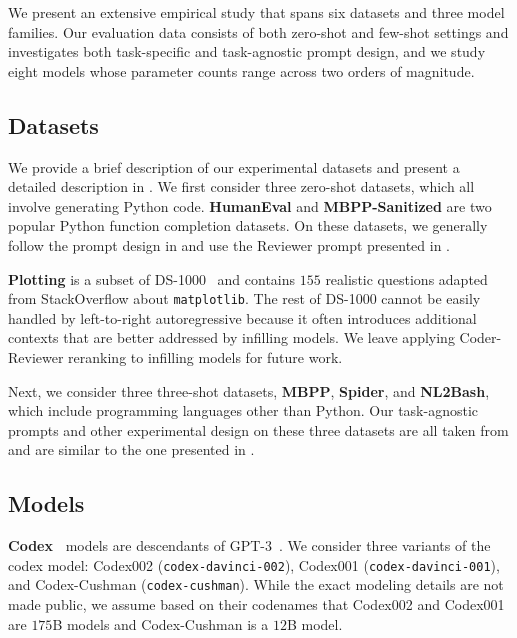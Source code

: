\documentclass[nohyperref]{article}
\theoremstyle{plain}
\theoremstyle{definition}
\theoremstyle{remark}
\renewcommand{\paragraph}[1]{
     \textbf{#1} 
 }
\begin{document}
\label{sec:exp-setup}
We present an extensive empirical study that spans six datasets and three model families.
Our evaluation data consists of both zero-shot and few-shot settings and investigates both task-specific and task-agnostic prompt design, and we study eight models whose parameter counts range across two orders of magnitude.


\subsection{Datasets}
We provide a brief description of our experimental datasets and present a detailed description in .
We first consider three zero-shot datasets, which all involve generating Python code.
\textbf{HumanEval} and \textbf{MBPP-Sanitized} are two popular Python function completion datasets.
On these datasets, we generally follow the prompt design in \citet{codet} and use the Reviewer prompt presented in .
\paragraph{Plotting} is a subset of DS-1000~\citep{Lai2022DS1000} and contains $155$ realistic questions adapted from StackOverflow about \texttt{matplotlib}. 
The rest of DS-1000 cannot be easily handled by left-to-right autoregressive because it often introduces additional contexts that are better addressed by infilling models.
We leave applying Coder-Reviewer reranking to infilling models for future work.



Next, we consider three three-shot datasets, \textbf{MBPP}, \textbf{Spider}, and \textbf{NL2Bash}, which include programming languages other than Python.
Our task-agnostic prompts and other experimental design on these three datasets are all taken from \citet{mbr} and are similar to the one presented in .


\subsection{Models}
\paragraph{Codex~\citep{codex}} models are descendants of GPT-3~\citep{gpt3}.
We consider three variants of the codex model: Codex002 (\texttt{codex-davinci-002}), Codex001 (\texttt{codex-davinci-001}), and Codex-Cushman (\texttt{codex-cushman}).
While the exact modeling details are not made public, we assume based on their codenames that Codex002 and Codex001 are $175$B models and Codex-Cushman is a $12$B model.
\end{document}
